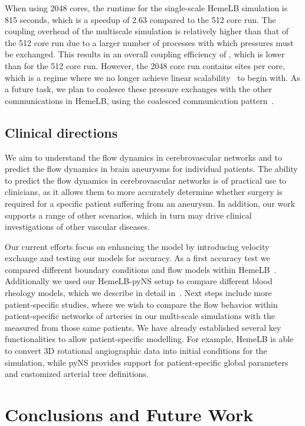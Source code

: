 \documentclass[a4,10pt]{article}
\begin{document}
When using 2048 cores, the runtime for the single-scale HemeLB simulation is
815 seconds, which is a speedup of 2.63 compared to the 512 core run. The
coupling overhead of the multiscale simulation is relatively higher than that
of the 512 core run due to a larger number of processes with which pressures
must be exchanged.  This results in an overall coupling efficiency of ,
which is lower than for the 512 core run. However, the 2048 core run contains
 sites per core, which is a regime where we no longer achieve linear
scalability~\cite{Groen:2012} to begin with. As a future task, we plan to
coalesce these pressure exchanges with the other communications in HemeLB,
using the coalesced communication pattern~\cite{Carver:2012-2}.



\subsection{Clinical directions}

We aim to understand the flow dynamics in cerebrovascular networks and to predict
the flow dynamics in brain aneurysms for individual patients. The ability to 
predict the flow dynamics in cerebrovascular networks is of practical use to 
clinicians, as it allows them to more accurately determine whether surgery is 
required for a specific patient suffering from an aneurysm. In addition, our 
work supports a range of other scenarios, which in turn may drive clinical 
investigations of other vascular diseases.

Our current efforts focus on enhancing the model by introducing velocity
exchange and testing our models for accuracy. As a first accuracy test we
compared different boundary conditions and flow models within
HemeLB~\cite{Carver:2012}. Additionally we used our HemeLB-pyNS setup to
compare different blood rheology models, which we describe in detail
in~\cite{Bernabeu:2012}. Next steps include more patient-specific studies,
where we wish to compare the flow behavior within patient-specific networks of
arteries in our multi-scale simulations with the measured from those same
patients. We have already established several key functionalities to allow
patient-specific modelling. For example, HemeLB is able to convert 3D
rotational angiographic data into initial conditions for the simulation, while
pyNS provides support for patient-specific global parameters and customized
arterial tree definitions.  

\section{Conclusions and Future Work}\label{Sec:conc}
\end{document}
